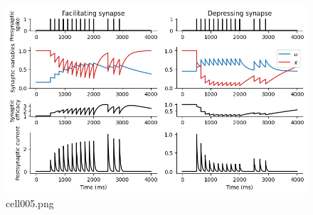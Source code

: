 \begin{figure}[ht]
	\centering
	\includegraphics[scale=0.8, max width=\linewidth]{./fig/synapse-model/dynamical-synapses/cell005.png}
	\caption{cell005.png}
	\label{cell005.png}
\end{figure}
